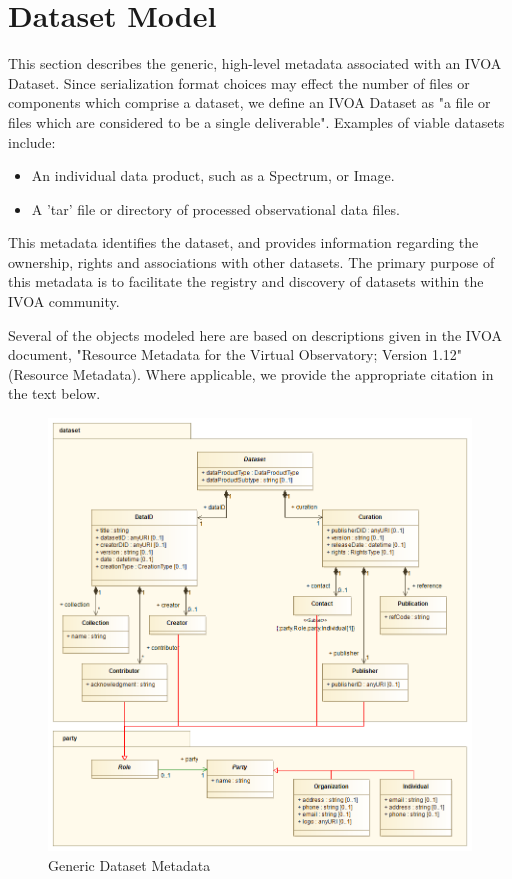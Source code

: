 \section{Dataset Model}
\label{sect:ds}

This section describes the generic, high-level metadata associated with an
IVOA Dataset. Since serialization format choices may effect the number of
files or components which comprise a dataset, we define an IVOA Dataset as
"a file or files which are considered to be a single deliverable".
Examples of viable datasets include:
\begin{itemize}
  \item An individual data product, such as a Spectrum, or Image.
  \item A 'tar' file or directory of processed observational data files.
\end{itemize}

This metadata identifies the dataset, and provides information regarding the
ownership, rights and associations with other datasets. The primary purpose
of this metadata is to facilitate the registry and discovery of datasets
within the IVOA community.

Several of the objects modeled here are based on descriptions given in the IVOA
document, "Resource Metadata for the Virtual Observatory; Version 1.12" \citep{2007ivoa.spec.0302H}
(Resource Metadata). Where applicable, we provide the appropriate citation
in the text below.

\begin{figure}[h]
\begin{center}
  \includegraphics[width=5.0in]{diagrams/Dataset_overview.png}
  \caption{Generic Dataset Metadata}\label{fig:ds_overview}
\end{center}
\end{figure}

